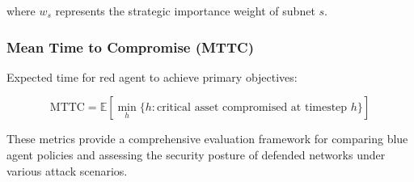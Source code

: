 \documentclass[11pt]{article}
\theoremstyle{definition}
\theoremstyle{plain}
\newcommand{\EE}{\mathbb{E}}
\begin{document}
where $w_s$ represents the strategic importance weight of subnet $s$.

\subsubsection{Mean Time to Compromise (MTTC)}
Expected time for red agent to achieve primary objectives:

\begin{equation}
\text{MTTC} = \EE\left[\min_h \{h : \text{critical asset compromised at timestep } h\}\right]
\end{equation}

These metrics provide a comprehensive evaluation framework for comparing blue agent policies and assessing the security posture of defended networks under various attack scenarios.



\end{document}
